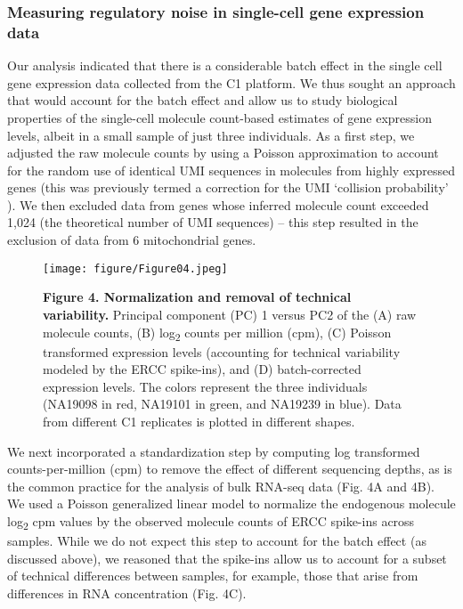 \subsubsection{Measuring regulatory noise in single-cell gene expression
data}\label{measuring-regulatory-noise-in-single-cell-gene-expression-data}

Our analysis indicated that there is a considerable batch effect in the
single cell gene expression data collected from the C1 platform. We thus
sought an approach that would account for the batch effect and allow us
to study biological properties of the single-cell molecule count-based
estimates of gene expression levels, albeit in a small sample of just
three individuals. As a first step, we adjusted the raw molecule counts
by using a Poisson approximation to account for the random use of
identical UMI sequences in molecules from highly expressed genes (this
was previously termed a correction for the UMI `collision probability'
\citep{Fu2011}). We then excluded data from genes whose inferred molecule
count exceeded 1,024 (the theoretical number of UMI sequences) -- this
step resulted in the exclusion of data from 6 mitochondrial genes.

\begin{figure}[htbp]
\centering
\texttt{[image: figure/Figure04.jpeg]}
\caption{\textbf{Figure 4. Normalization and removal of technical
variability.} Principal component (PC) 1 versus PC2 of the (A) raw
molecule counts, (B) log\textsubscript{2} counts per million (cpm), (C)
Poisson transformed expression levels (accounting for technical
variability modeled by the ERCC spike-ins), and (D) batch-corrected
expression levels. The colors represent the three individuals (NA19098
in red, NA19101 in green, and NA19239 in blue). Data from different C1
replicates is plotted in different shapes.}
\end{figure}

We next incorporated a standardization step by computing log transformed
counts-per-million (cpm) to remove the effect of different sequencing
depths, as is the common practice for the analysis of bulk RNA-seq data
(Fig. 4A and 4B). We used a Poisson generalized linear model to
normalize the endogenous molecule log\textsubscript{2} cpm values by the
observed molecule counts of ERCC spike-ins across samples. While we do
not expect this step to account for the batch effect (as discussed
above), we reasoned that the spike-ins allow us to account for a subset
of technical differences between samples, for example, those that arise
from differences in RNA concentration (Fig. 4C).

